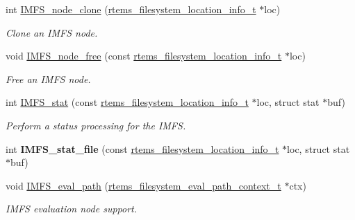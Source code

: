 \begin{DoxyCompactItemize}
\mbox{\label{group__IMFS_ga7f8170e23a6017454964698feff3fe9d}} 
int \mbox{\hyperlink{group__IMFS_ga7f8170e23a6017454964698feff3fe9d}{I\+M\+F\+S\+\_\+node\+\_\+clone}} (\mbox{\hyperlink{group__LibIO_ga3252b3d31ee3c49ffff0b7604a676864}{rtems\+\_\+filesystem\+\_\+location\+\_\+info\+\_\+t}} $\ast$loc)
\begin{DoxyCompactList}\small\item\em Clone an I\+M\+FS node. \end{DoxyCompactList}\item 
\mbox{\label{group__IMFS_ga685f93659fedfbabd0ddaa68d14ffc49}} 
void \mbox{\hyperlink{group__IMFS_ga685f93659fedfbabd0ddaa68d14ffc49}{I\+M\+F\+S\+\_\+node\+\_\+free}} (const \mbox{\hyperlink{group__LibIO_ga3252b3d31ee3c49ffff0b7604a676864}{rtems\+\_\+filesystem\+\_\+location\+\_\+info\+\_\+t}} $\ast$loc)
\begin{DoxyCompactList}\small\item\em Free an I\+M\+FS node. \end{DoxyCompactList}\item 
int \mbox{\hyperlink{group__IMFS_gae973c8964e50b22d9c1171ef38d4eaa7}{I\+M\+F\+S\+\_\+stat}} (const \mbox{\hyperlink{group__LibIO_ga3252b3d31ee3c49ffff0b7604a676864}{rtems\+\_\+filesystem\+\_\+location\+\_\+info\+\_\+t}} $\ast$loc, struct stat $\ast$buf)
\begin{DoxyCompactList}\small\item\em Perform a status processing for the I\+M\+FS. \end{DoxyCompactList}\item 
\mbox{\label{group__IMFS_ga0b7709e591614ae3794ca2e989093808}} 
int {\bfseries I\+M\+F\+S\+\_\+stat\+\_\+file} (const \mbox{\hyperlink{group__LibIO_ga3252b3d31ee3c49ffff0b7604a676864}{rtems\+\_\+filesystem\+\_\+location\+\_\+info\+\_\+t}} $\ast$loc, struct stat $\ast$buf)
\item 
\mbox{\label{group__IMFS_gad019933cd11e323f19e12d64cd28d0ac}} 
void \mbox{\hyperlink{group__IMFS_gad019933cd11e323f19e12d64cd28d0ac}{I\+M\+F\+S\+\_\+eval\+\_\+path}} (\mbox{\hyperlink{structrtems__filesystem__eval__path__context__t}{rtems\+\_\+filesystem\+\_\+eval\+\_\+path\+\_\+context\+\_\+t}} $\ast$ctx)
\begin{DoxyCompactList}\small\item\em I\+M\+FS evaluation node support. \end{DoxyCompactList}\item 

\end{DoxyCompactItemize}
